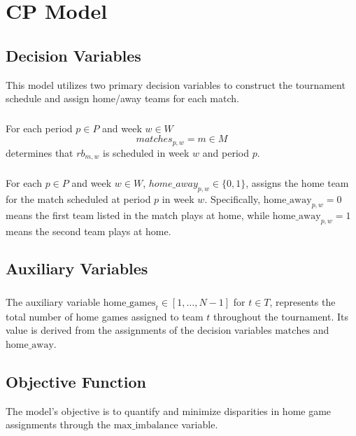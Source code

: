 \section{CP Model}
\subsection{Decision Variables}
This model utilizes two primary decision variables to construct the tournament schedule and assign home/away teams for each match.

\subsubsection{}

For each period $p \in P$ and week $w \in W$
$$
matches_{p,w}=m \in M
$$
determines that $rb_{m, w}$ is scheduled in week $w$ and period $p$.


\subsubsection{}
For each $p \in P$ and week $w \in W$, $home\_away_{p, w} \in \{0, 1\}$, assigns the home team for the match scheduled at period $p$ in week $w$. Specifically, $\text{home\_away}_{p, w} = 0$ means the first team listed in the match plays at home, while $\text{home\_away}_{p, w} = 1$ means the second team plays at home.

\subsection{Auxiliary Variables}
\subsubsection{}
The auxiliary variable $\text{home\_games}_{t} \in [1, \dots, N-1]$ for $t \in T$, represents the total number of home games assigned to team $t$ throughout the tournament. Its value is derived from the assignments of the decision variables $\text{matches}$ and $\text{home\_away}$.


\subsection{Objective Function}

The model's objective is to quantify and minimize disparities in home game assignments through the $\text{max\_imbalance}$ variable.

